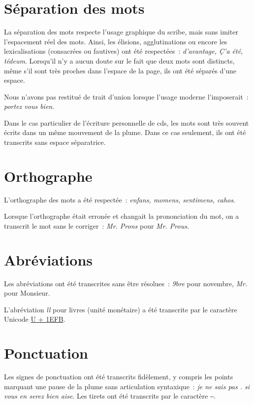 \documentclass[a4paper,12pt,twoside]{book}
\begin{document}
		\section{Séparation des mots}
			La séparation des mots respecte l'usage graphique du scribe, mais sans imiter l'espacement réel des mots. Ainsi, les élisions, agglutinations ou encore les lexicalisations (consacrées ou fautives) ont été respectées~: \textit{d'avantage, Ç'a été, tédeum}. Lorsqu'il n'y a aucun doute sur le fait que deux mots sont distincts, même s'il sont très proches dans l'espace de la page, ils ont été séparés d'une espace.
		
			Nous n'avons pas restitué de trait d'union lorsque l'usage moderne l'imposerait~: \textit{portez vous bien}.
	
			Dans le cas particulier de l'écriture personnelle de \gls{cds}, les mots sont très souvent écrits dans un même mouvement de la plume. Dans ce cas seulement, ils ont été transcrits sans espace séparatrice.
				
		\section{Orthographe}
			L'orthographe des mots a été respectée~: \textit{enfans, momens, sentimens, cahos}.
			
			Lorsque l'orthographe était erronée et changait la prononciation du mot, on a transcrit le mot sans le corriger~: \textit{Mr. Prons} pour \textit{Mr. Prous}.
		
		\section{Abréviations}
			Les abréviations ont été transcrites sans être résolues~: \textit{9bre} pour novembre, \textit{Mr.} pour Monsieur.
		
			L'abréviation \textit{ll} pour livres (unité monétaire) a été transcrite par le caractère Unicode \href{https://mufi.info/m.php?p=muficharinfo&i=4088}{U + 1EFB}.

		\section{Ponctuation}
			Les signes de ponctuation ont été transcrits fidèlement, y compris les points marquant une pause de la plume sans articulation syntaxique~: \textit{je ne sais pas . si vous en serez bien aise}. Les tirets ont été transcrits par le caractère ‒.
		
\end{document}
